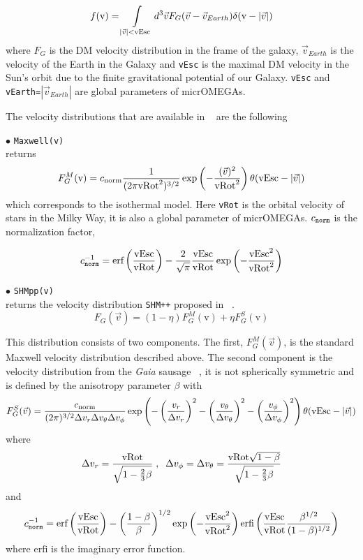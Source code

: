 \documentclass[12pt,a4paper]{article}
\begin{document}
$$f(\mbox{v})=  \int\limits_{|\vec{v}|<\rm{vEsc}} d^3\vec{v} F_G(\vec{v} -\vec{v}_{Earth})
\delta(\mbox{v} -|\vec{v}|) 
$$
where $F_G$ is the DM velocity distribution in the  frame of the galaxy, $\vec{v}_{Earth}$ is the velocity of the
Earth in the Galaxy and {\tt vEsc} is the maximal DM velocity in the Sun's orbit due to the
finite gravitational potential of our Galaxy. {\tt vEsc} and {\tt vEarth=}$|\vec{v}_{Earth}|$ are global
parameters of micrOMEGAs. 

The velocity distributions that are available  in \micro~ are the following

\noindent
$\bullet$ \verb|Maxwell(v)| \\
returns   
$$F_G^M(\mbox{v})=  c_{\rm{norm}} \frac{1}{(2\pi \rm{vRot}^2)^{3/2}} \exp\left(
-\frac{(\vec{v})^2}{\rm{vRot}^2}\right)\theta(\mbox{vEsc} -|\vec{v}|)
$$
which corresponds to the isothermal model. Here  {\tt vRot} is the orbital velocity of stars in the Milky Way, it is also a  global 
parameter of micrOMEGAs. $c_{\tt norm}$ is the normalization factor,

$$
c_{\tt norm}^{-1}=  {\mbox{erf}}\left(\frac{\mbox{vEsc}}{\rm{vRot}} \right) -\frac{2}{\sqrt{\pi}} \frac{\mbox{vEsc}}{\rm{vRot}} \exp\left( -\frac{\mbox{vEsc}^2}{\rm{vRot}^2}\right)
$$  

\noindent
$\bullet$ \verb|SHMpp(v)|\\
returns the  velocity distribution {\tt SHM++}  proposed in ~\cite{Evans:2018bqy}.
\begin{equation}
F_G(\vec{v}) = (1-\eta) F_G^M(\mbox{v}) +\eta F_G^S(\mbox{v})
\end{equation}

This distribution consists of two components. The first, $F_G^M(\vec{v})$,   
is  the standard Maxwell velocity distribution described above.   The second component  is the velocity distribution from the {\it Gaia} sausage ~\cite{Belokurov_2018,Myeong:2018kfh}, it  is not spherically symmetric and is defined by the
anisotropy parameter $\beta$ with
\begin{equation}
 F_G^S(\vec{v})=   \frac{c_{\rm{norm}} }{(2\pi)^{3/2} \Delta v_r \Delta v_\theta\Delta v_\phi}
  \exp\left( -\left( \frac{v_r}{\Delta v_r}\right)^2 
 -\left( \frac{v_\theta}{\Delta v_\theta}\right)^2  -\left( \frac{v_\phi}{\Delta v_\phi}\right)^2   \right)
\theta(\mbox{vEsc} -|\vec{v}|)
\end{equation}
where  
\begin{equation}
\Delta v_r= \frac{\rm{vRot}}{\sqrt{1-\frac{2}{3}\beta}}\;,\;\; \Delta v_\phi=\Delta v_\theta=\frac{\rm{vRot} \sqrt{1-\beta}}{\sqrt{1-\frac{2}{3}\beta}} 
\end{equation}  
and 
$$
c_{\tt norm}^{-1}= {\mbox{erf}}\left(\frac{\mbox{vEsc}}{\rm{vRot}} \right) - \left( \frac{1-\beta}{\beta} \right)^{1/2}   \exp\left( -\frac{\mbox{vEsc}^2}{\rm{vRot}^2}\right) 
{\mbox{erfi}}\left( \frac{\mbox{vEsc}}{\rm{vRot}}\frac{\beta^{1/2}}{(1-\beta)^{1/2}}        \right)
$$  
where ${\mbox{erfi}}$ is the imaginary error function.
  
\end{document}
